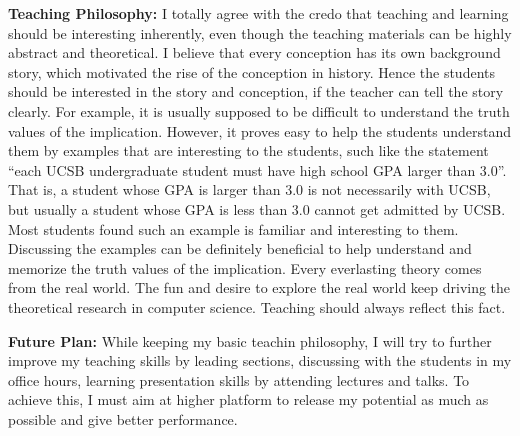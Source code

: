 \documentclass[12pt]{article}
\begin{document}
{\bf Teaching Philosophy:} I totally agree with the credo that teaching and learning should be interesting inherently, even though the teaching materials can be highly abstract and theoretical. I believe that every conception has its own background story, which motivated the rise of the conception in history. Hence the students should be interested in the story and conception, if the teacher can tell the story clearly. For example, it is usually supposed to be difficult to understand the truth values of the implication. However, it proves easy to help the students understand them by examples that are interesting to the students, such like the statement ``each UCSB undergraduate student must have high school GPA larger than 3.0''. That is, a student whose GPA is larger than 3.0 is not necessarily with UCSB, but usually a student whose GPA is less than 3.0 cannot get admitted by UCSB. Most students found such an example is familiar and interesting to them. Discussing the examples can be definitely beneficial to help understand and memorize the truth values of the implication. Every everlasting theory comes from the real world. The fun and desire to explore the real world keep driving the theoretical research in computer science. Teaching should always reflect this fact.

{\bf Future Plan:} While keeping my basic teachin philosophy, I will try to further improve my teaching skills by leading sections, discussing with the students in my office hours, learning presentation skills by attending lectures and talks. To achieve this, I must aim at higher platform to release my potential as much as possible and give better performance.
\end{document}
